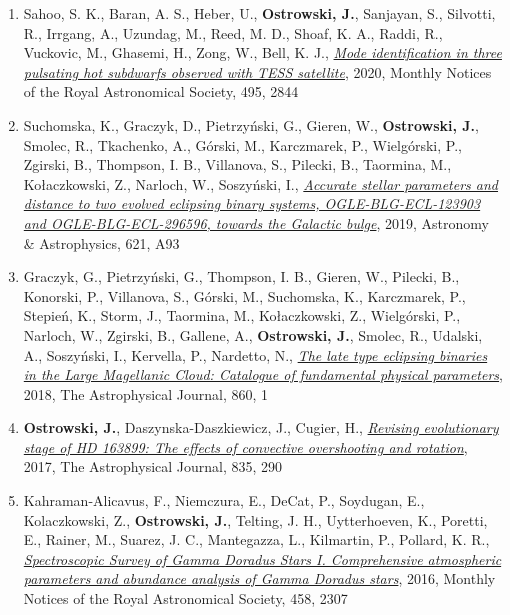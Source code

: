 \documentclass[margin, 10pt]{res} %
\begin{document}
\begin{resume}
\begin{enumerate}
    \item Sahoo, S. K., Baran, A. S., Heber, U., \textbf{Ostrowski, J.}, Sanjayan, S., Silvotti, R., Irrgang, A., Uzundag, M., Reed, M. D., Shoaf, K. A., Raddi, R., Vuckovic, M., Ghasemi, H., Zong, W., Bell, K. J., \href{https://ui.adsabs.harvard.edu/abs/2020MNRAS.495.2844S/abstract}{\textit{Mode identification in three pulsating hot subdwarfs observed with TESS satellite}}, 2020, Monthly Notices of the Royal Astronomical Society, 495, 2844

    \item Suchomska, K., Graczyk, D., Pietrzyński, G., Gieren, W., \textbf{Ostrowski, J.}, Smolec, R., Tkachenko, A., Górski, M., Karczmarek, P., Wielgórski, P., Zgirski, B., Thompson, I. B., Villanova, S., Pilecki, B., Taormina, M., Kołaczkowski, Z., Narloch, W., Soszyński, I., \href{https://ui.adsabs.harvard.edu/abs/2019A%26A...621A..93S/abstract}{\textit{Accurate stellar parameters and distance to two evolved eclipsing binary systems, OGLE-BLG-ECL-123903 and OGLE-BLG-ECL-296596, towards the Galactic bulge}}, 2019, Astronomy \& Astrophysics, 621, A93

    \item Graczyk, G., Pietrzy\'{n}ski, G., Thompson, I. B., Gieren, W., Pilecki, B., Konorski, P., Villanova, S., G\'{o}rski, M., Suchomska, K., Karczmarek, P., Stepie\'{n}, K., Storm, J., Taormina, M., Ko\l{}aczkowski, Z., Wielg\'{o}rski, P., Narloch, W., Zgirski, B., Gallene, A., \textbf{Ostrowski, J.}, Smolec, R., Udalski, A., Soszy\'{n}ski, I., Kervella, P., Nardetto, N., \href{https://ui.adsabs.harvard.edu/abs/2018ApJ...860....1G/abstract}{\textit{The late type eclipsing binaries in the Large Magellanic Cloud: Catalogue of fundamental physical parameters}}, 2018, The Astrophysical Journal, 860, 1

    \item \textbf{Ostrowski, J.}, Daszynska-Daszkiewicz, J., Cugier, H., \href{http://adsabs.harvard.edu/abs/2017ApJ...835..290O}{\textit{Revising  evolutionary stage of HD 163899: The effects of convective overshooting and rotation}}, 2017, The Astrophysical Journal, 835, 290

    \item Kahraman-Alicavus, F., Niemczura, E., DeCat, P., Soydugan, E., Kolaczkowski, Z., \textbf{Ostrowski, J.}, Telting, J. H., Uytterhoeven, K., Poretti, E., Rainer, M., Suarez, J. C., Mantegazza, L., Kilmartin, P., Pollard, K. R., \href{http://adsabs.harvard.edu/abs/2016MNRAS.458.2307K}{\textit{Spectroscopic Survey of Gamma Doradus Stars I. Comprehensive atmospheric parameters and abundance analysis of Gamma Doradus stars}},  2016, Monthly Notices of the Royal Astronomical Society, 458, 2307


\end{enumerate}
\end{resume}
\end{document}
